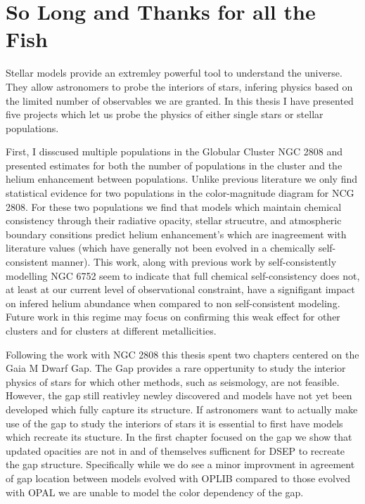 \chapter{So Long and Thanks for all the Fish}
Stellar models provide an extremley powerful tool to understand the universe.
They allow astronomers to probe the interiors of stars, infering physics based
on the limited number of observables we are granted. In this thesis I have
presented five projects which let us probe the physics of either single stars
or stellar populations.

First, I disscused multiple populations in the Globular Cluster NGC 2808 and
presented estimates for both the number of populations in the cluster and the
helium enhancement between populations. Unlike previous literature we only find
statistical evidence for two populations in the color-magnitude diagram for NCG
2808. For these two populations we find that models which maintain chemical
consistency through their radiative opacity, stellar strucutre, and atmospheric
boundary consitions predict helium enhancement's which are inagreement with
literature values (which have generally not been evolved in a chemically
self-consistent manner). This work, along with previous work by
\citet{Dotter2016} self-consistently modelling NGC 6752 seem to indicate that
full chemical self-consistency does not, at least at our current level of
observational constraint, have a signifigant impact on infered helium abundance
when compared to non self-consistent modeling. Future work in this regime may
focus on confirming this weak effect for other clusters and for clusters at
different metallicities.

Following the work with NGC 2808 this thesis spent two chapters centered on the
Gaia M Dwarf Gap. The Gap provides a rare oppertunity to study the interior
physics of stars for which other methods, such as seismology, are not feasible.
However, the gap still reativley newley discovered and models have not yet been
developed which fully capture its structure. If astronomers want to actually
make use of the gap to study the interiors of stars it is essential to first
have models which recreate its stucture. In the first chapter focused on the
gap we show that updated opacities are not in and of themselves sufficnent for
DSEP to recreate the gap structure. Specifically while we do see a minor
improvment in agreement of gap location between models evolved with OPLIB
compared to those evolved with OPAL we are unable to model the color dependency
of the gap. 

